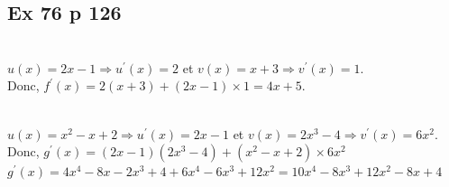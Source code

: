 \documentclass[12pt,a4paper]{book}
\begin{document}
\subsection*{Ex 76 p 126}
\begin{enumMet}
    \item {}\\
    $u(x)=2 x-1 \Rightarrow u^{\prime}(x)=2$ et $v(x)=x+3 \Rightarrow v^{\prime}(x)=1$.\\
    Donc, $f^{\prime}(x)=2(x+3)+(2 x-1) \times 1=4 x+5$.
    \item {}\\
    $u(x)=x^{2}-x+2 \Rightarrow u^{\prime}(x)=2 x-1$ et
$v(x)=2 x^{3}-4 \Rightarrow v^{\prime}(x)=6 x^{2} .$\\
Donc, $g^{\prime}(x)=(2 x-1)\left(2 x^{3}-4\right)+\left(x^{2}-x+2\right) \times 6 x^{2}$\\
$g^{\prime}(x)=4 x^{4}-8 x-2 x^{3}+4+6 x^{4}-6 x^{3}+12 x^{2}=10 x^{4}-8 x^{3}+12 x^{2}-8 x+4$
\end{enumMet}
\end{document}
